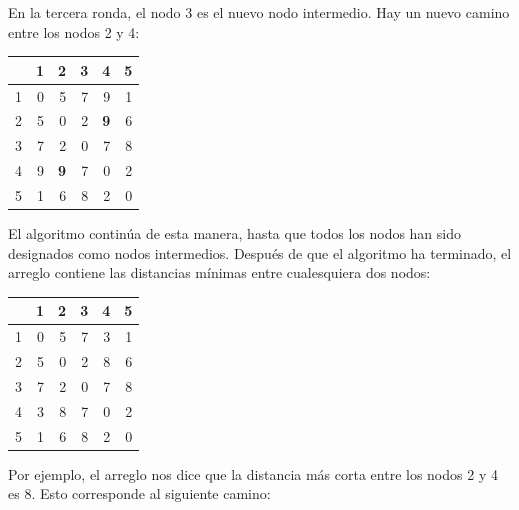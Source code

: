 En la tercera ronda, el nodo 3 es el nuevo nodo intermedio.
Hay un nuevo camino entre los nodos 2 y 4:

\begin{center}
\begin{tabular}{r|rrrrr}
 & 1 & 2 & 3 & 4 & 5 \\
\hline
1 & 0 & 5 & 7 & 9 & 1 \\
2 & 5 & 0 & 2 & \textbf{9} & 6 \\
3 & 7 & 2 & 0 & 7 & 8 \\
4 & 9 & \textbf{9} & 7 & 0 & 2 \\
5 & 1 & 6 & 8 & 2 & 0 \\
\end{tabular}
\end{center}
\vspace{10pt}

El algoritmo continúa de esta manera,
hasta que todos los nodos han sido designados como nodos intermedios.
Después de que el algoritmo ha terminado, el arreglo contiene
las distancias mínimas entre cualesquiera dos nodos:

\begin{center}
\begin{tabular}{r|rrrrr}
 & 1 & 2 & 3 & 4 & 5 \\
\hline
1 & 0 & 5 & 7 & 3 & 1 \\
2 & 5 & 0 & 2 & 8 & 6 \\
3 & 7 & 2 & 0 & 7 & 8 \\
4 & 3 & 8 & 7 & 0 & 2 \\
5 & 1 & 6 & 8 & 2 & 0 \\
\end{tabular}
\end{center}

Por ejemplo, el arreglo nos dice que la
distancia más corta entre los nodos 2 y 4 es 8.
Esto corresponde al siguiente camino:

\begin{center}
\end{center}


